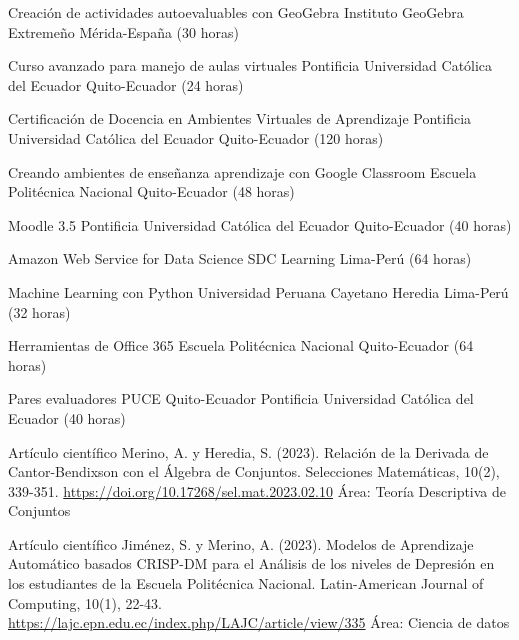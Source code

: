 \documentclass[
	a4paper,
	maincolor=cvblue!70!blue,
	sidecolor=gray!30,
	sectioncolor=cvblue!70!blue,
    sidebarwidth=7.5cm,
	topbottommargin=20pt,
	leftrightmargin=20pt,
]{fortysecondscv}
\begin{document}
    {Creación de actividades autoevaluables con GeoGebra}
    {Instituto GeoGebra Extremeño}
    {Mérida-España (30 horas)}

    {Curso avanzado para manejo de aulas virtuales}
    {Pontificia Universidad Católica del Ecuador}
    {Quito-Ecuador (24 horas)}

    {Certificación de Docencia en Ambientes Virtuales de Aprendizaje}
    {Pontificia Universidad Católica del Ecuador}
    {Quito-Ecuador (120 horas)}

    {Creando ambientes de enseñanza aprendizaje con Google Classroom}
    {Escuela Politécnica Nacional}
    {Quito-Ecuador (48 horas)}

    {Moodle 3.5}
    {Pontificia Universidad Católica del Ecuador}
    {Quito-Ecuador (40 horas)}


    {Amazon Web Service for Data Science}
    {SDC Learning}
    {Lima-Perú (64 horas)}

    {Machine Learning con Python}
    {Universidad Peruana Cayetano Heredia}
    {Lima-Perú (32 horas)}

    {Herramientas de Office 365}
    {Escuela Politécnica Nacional}
    {Quito-Ecuador (64 horas)}

    {Pares evaluadores PUCE}
    {Quito-Ecuador}
    {Pontificia Universidad Católica del Ecuador (40 horas)}


    {Artículo científico}
    {Merino, A. y Heredia, S. (2023). Relación de la Derivada de Cantor-Bendixson con el Álgebra de Conjuntos. Selecciones Matemáticas, 10(2), 339-351.}
    {\url{https://doi.org/10.17268/sel.mat.2023.02.10}}
    {Área: Teoría Descriptiva de Conjuntos}
    
    {Artículo científico}
    {Jiménez, S. y Merino, A. (2023). Modelos de Aprendizaje Automático basados CRISP-DM para el Análisis de los niveles de Depresión en los estudiantes de la Escuela Politécnica Nacional. Latin-American Journal of Computing, 10(1), 22-43.}     
    {\url{https://lajc.epn.edu.ec/index.php/LAJC/article/view/335}}
    {Área: Ciencia de datos}
    
\end{document}
